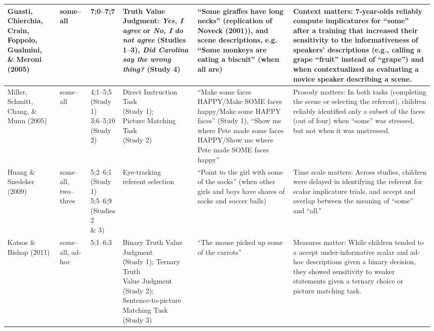 \documentclass[man]{apa2}
\begin{document}
\begin{landscape}
\begin{table}[!ht]
\begin{tabular}{| p{2.2cm} | p{2cm} | p{1.69cm} | p{4.5cm} | p{5cm} | p{7.2cm} |}
\parbox[t]{2.2cm}{Guasti, Chierchia, Crain, Foppolo, Gualmini,\\\& Meroni (2005)} & some--all & 7;0--7;7 & Truth Value Judgment: \textit{Yes, I agree} or \textit{No, I do not agree} (Studies 1--3), \textit{Did Carolina say the wrong thing?} (Study 4) & ``Some giraffes have long necks'' (replication of Noveck (2001)), and scene descriptions, e.g. ``Some monkeys are eating a biscuit'' (when all are) & Context matters: 7-year-olds reliably compute implicatures for ``some'' after a training that increased their sensitivity to the informativeness of speakers' descriptions (e.g., calling a grape ``fruit'' instead of ``grape'') and when contextualized as evaluating a novice speaker describing a scene.\\ \hline
Miller, Schmitt, Chang, \& Munn (2005) & some--all & \parbox[t]{1.69cm}{4;1--5;5\\(Study 1)\\ 3;6--5;10\\(Study 2)} & \parbox[t]{4.5cm}{Direct Instruction Task\\(Study 1);\\Picture Matching Task\\(Study 2)} & ``Make some faces HAPPY/Make SOME faces happy/Make some HAPPY faces'' (Study 1), ``Show me where Pete made some faces HAPPY/Show me where Pete made SOME faces happy'' & Prosody matters: In both tasks (completing the scene or selecting the referent), children reliably identified only a subset of the faces (out of four) when ``some'' was stressed, but not when it was unstressed.\\ \hline
\parbox[t]{2.2cm}{Huang \&\\Snedeker (2009)} & \parbox[t]{2cm}{some--all,\\two--three} &\parbox[t]{1.69cm}{5;2--6;1\\(Study 1)\\5;5--6;9 \\(Studies 2\\\& 3)} & \parbox[t]{4.5cm}{Eye-tracking\\referent selection} & ``Point to the girl with some of the socks'' (when other girls and boys have shares of socks and soccer balls) & Time scale matters: Across studies, children were delayed in identifying the referent for scalar implicature trials, and accept and overlap between the meaning of ``some'' and ``all.'' \\ \hline
Katsos \& Bishop (2011) & some--all, ad-hoc & 5;1--6;3  & \parbox[t]{4.5cm}{Binary Truth Value Judgment\\(Study 1); Ternary Truth\\Value Judgment (Study 2);\\Sentence-to-picture Matching Task\\(Study 3)} & ``The mouse picked up some of the carrots'' & Measures matter: While children tended to a accept under-informative scalar and ad-hoc descriptions given a binary decision, they showed sensitivity to weaker statements given a ternary choice or picture matching task. \\ \hline

\end{tabular}
\end{table}
\end{landscape}
\end{document}
